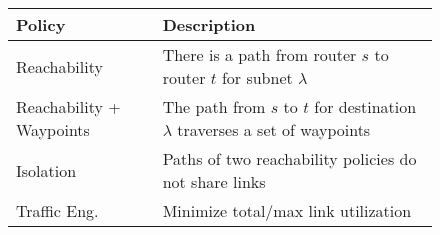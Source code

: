 \begin{figure}
\vspace{-2mm}
\small
\begin{minipage}{\columnwidth}
	\begin{tabular}{m{6em}  m{21em} } 
		{\bf Policy} & {\bf Description} \\ 
		\hline
		Reachability & There is a path from router $s$ to router $t$ for subnet $\lambda$ \\ \hline
		Reachability + \newline Waypoints & The path  from $s$ to $t$ for destination $\lambda$ 
		traverses a set of waypoints\\ \hline
		Isolation & Paths of two reachability policies do not share links \\ \hline
		Traffic  Eng.  & Minimize total/max link utilization 
	\end{tabular}
	\end{minipage}
	\vspace{-1mm}
	\label{tab:policysupport}
\end{figure}
